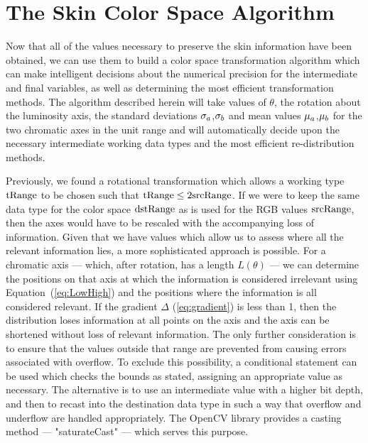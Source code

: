 \section{The Skin Color Space Algorithm}

Now that all of the values necessary to preserve the skin information have been obtained, we can use them to build a color space transformation algorithm which can make intelligent decisions about the numerical precision for the intermediate and final variables, as well as determining the most efficient transformation methods. The algorithm described herein will take values of $\theta$, the rotation about the luminosity axis, the standard deviations $ \sigma_a$,$ \sigma_b$ and mean values $ \mu_a$,$ \mu_b$ for the two chromatic axes in the unit range  and will automatically decide upon the necessary intermediate working data types and the most efficient re-distribution methods.

Previously, we found a rotational transformation which allows a working type $\text{tRange}$ to be chosen such that $\text{tRange} \le 2 \text{srcRange}$. If we were to keep the same data type for the color space $\text{dstRange}$ as is used for the RGB values $\text{srcRange}$, then the axes would have to be rescaled with the accompanying loss of information. Given that we have values which allow us to assess where all the relevant information lies, a more sophisticated approach is possible. For a chromatic axis --- which, after rotation, has a length $L(\theta)$ --- we can determine the positions on that axis at which the information is considered irrelevant using Equation~(\ref{eq:LowHigh}) and the positions where the information is all considered relevant. If the gradient $ \Delta$ (\ref{eq:gradient}) is less than 1, then the distribution loses information at all points on the axis and the axis can be shortened without loss of relevant information. The only further consideration is to ensure that the values outside that range are prevented from causing errors associated with overflow. To exclude this possibility, a conditional statement can be used which checks the bounds as stated, assigning an appropriate value as necessary. The alternative is to use an intermediate value with a higher bit depth, and then to recast into the destination data type in such a way that overflow and underflow are handled appropriately. The OpenCV library provides a casting method --- "saturateCast" --- which serves this purpose.

